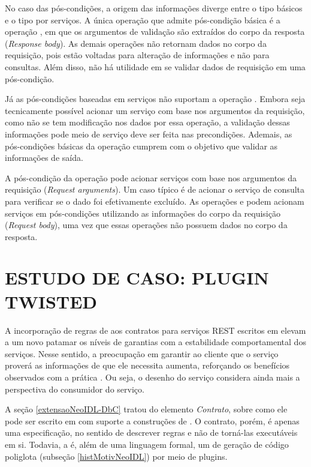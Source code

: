 No caso das pós-condições, a origem das informações diverge entre o tipo
básicos e o tipo por serviços. A única operação que admite pós-condição básica é
a operação , em que os argumentos de validação são extraídos do
corpo da resposta (\textit{Response body}). As demais operações não retornam dados
no corpo da requisição, pois estão voltadas para alteração de informações e não
para consultas. Além disso, não há utilidade em se validar dados de requisição
em uma pós-condição.

Já as pós-condições baseadas em serviços não suportam a operação .
Embora seja tecnicamente possível acionar um serviço com base nos argumentos da
requisição, como não se tem modificação nos dados por essa operação, a
validação dessas informações pode meio de serviço deve ser feita nas
precondições. Ademais, as pós-condições básicas da operação  cumprem
com o objetivo que validar as informações de saída.

A pós-condição da operação  pode acionar serviços com base nos
argumentos da requisição (\textit{Request arguments}). Um caso típico é de
acionar o serviço de consulta para verificar se o dado foi efetivamente
excluído. As operações  e  podem acionam serviços em
pós-condições utilizando as informações do corpo da requisição (\textit{Request
body}), uma vez que essas operações não possuem dados no corpo da resposta. 



\section{ESTUDO DE CASO: PLUGIN TWISTED}
\label{pluginTwisted}

A incorporação de regras de \designbycontract{} aos contratos para
serviços REST escritos em \neoidl{} elevam a um novo patamar os níveis de
garantias com a estabilidade comportamental dos serviços. Nesse sentido, a
preocupação em garantir ao cliente que o serviço proverá as informações de que
ele necessita aumenta, reforçando os benefícios observados com a prática
\CtFirst{}. Ou seja, o desenho do serviço considera ainda mais a perspectiva do
consumidor do serviço.

A seção \ref{extensaoNeoIDL-DbC} tratou do elemento \emph{Contrato}, sobre como
ele pode ser escrito em \neoidl{} com suporte a construções de
\designbycontract{}. O contrato, porém, é apenas uma especificação, no
sentido de descrever regras e não de torná-las executáveis em si. Todavia, a
\neoidl{} é, além de uma linguagem formal, um \framework{} de geração de
código poliglota (subseção \ref{histMotivNeoIDL}) por meio de plugins.

